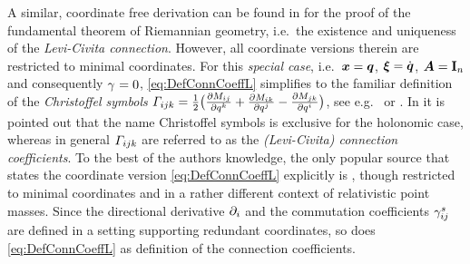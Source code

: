 A similar, coordinate free derivation can be found in \cite[proof of Theorem 2.7.6]{Abraham:FoundationsOfMechanics} for the proof of the fundamental theorem of Riemannian geometry, i.e.\ the existence and uniqueness of the \textit{Levi-Civita connection}.
However, all coordinate versions therein are restricted to minimal coordinates.
For this \textit{special case}, i.e.\ $\sysCoord = \genCoord$, $\sysVel = \genCoordd$, $\kinMat=\idMat[\dimConfigSpace]$ and consequently $\BoltzSym{}{}{} = 0$, \eqref{eq:DefConnCoeffL} simplifies to the familiar definition of the \textit{Christoffel symbols} $\ConnCoeffL{\LidxI}{\LidxII}{\LidxIII} = \tfrac{1}{2}\big( \pdiff[\sysInertiaMatCoeff{\LidxI\LidxII}]{\genCoordCoeff{\LidxIII}} + \pdiff[\sysInertiaMatCoeff{\LidxI\LidxIII}]{\genCoordCoeff{\LidxII}} - \pdiff[\sysInertiaMatCoeff{\LidxII\LidxIII}]{\genCoordCoeff{\LidxI}} \big)$, see e.g.\ \cite[p.\,145]{Abraham:FoundationsOfMechanics} or \cite[Vol.\,2, p.\,221]{Spivak:DiffGeo}.
In \cite[sec.\,9.2]{Frankel:GeometryOfPhysics} it is pointed out that the name Christoffel symbols is exclusive for the holonomic case, whereas in general $\ConnCoeffL{\LidxI}{\LidxII}{\LidxIII}$ are referred to as the \textit{(Levi-Civita) connection coefficients}.
To the best of the authors knowledge, the only popular source that states the coordinate version \eqref{eq:DefConnCoeffL} explicitly is \cite[eq.\ 8.24]{Misner:Gravitation}, though restricted to minimal coordinates and in a rather different context of relativistic point masses.
Since the directional derivative $\dirDiff{\LidxI}$ and the commutation coefficients $\BoltzSym{\LidxV}{\LidxI}{\LidxII}$ are defined in a setting supporting redundant coordinates, so does \eqref{eq:DefConnCoeffL} as definition of the connection coefficients.




